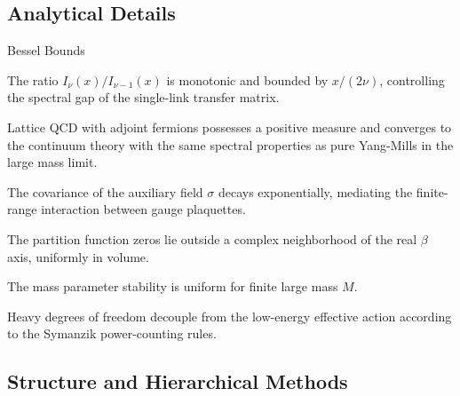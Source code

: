 \subsection{Analytical Details}

\begin{subsection}{Bessel Bounds}
\label{subsec:bessel-bounds}
\begin{lemma}
\label{lem:bessel-ratio-main}
The ratio $I_\nu(x)/I_{\nu-1}(x)$ is monotonic and bounded by $x/(2\nu)$, controlling the spectral gap of the single-link transfer matrix.
\end{lemma}
\end{subsection}

\begin{proposition}
\label{prop:af-lattice}
\label{thm:adjoint-qcd-rigorous}
Lattice QCD with adjoint fermions possesses a positive measure and converges to the continuum theory with the same spectral properties as pure Yang-Mills in the large mass limit.
\end{proposition}

\begin{theorem}
\label{thm:sigma-decay-bound}
The covariance of the auxiliary field $\sigma$ decays exponentially, mediating the finite-range interaction between gauge plaquettes.
\end{theorem}

\begin{theorem}
\label{thm:uniform-zero-free-strong}
\label{prop:lee-yang-intermediate}
The partition function zeros lie outside a complex neighborhood of the real $\beta$ axis, uniformly in volume.
\end{theorem}

\begin{theorem}
\label{thm:uniform-bound-m-finite}
The mass parameter stability is uniform for finite large mass $M$.
\end{theorem}

\begin{proposition}[Decoupling]
\label{prop:decoupling-rigorous}
Heavy degrees of freedom decouple from the low-energy effective action according to the Symanzik power-counting rules.
\end{proposition}

\subsection{Structure and Hierarchical Methods}

